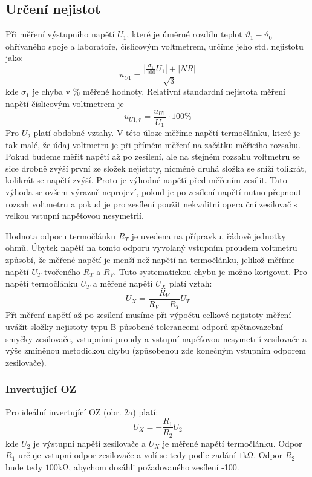 \documentclass{article}
\begin{document}
\subsection{Určení nejistot}
Při měření výstupního napětí $U_1$, které je úměrné rozdílu teplot $\vartheta_1 - \vartheta_0$ ohřívaného spoje a laboratoře, číslicovým voltmetrem, určíme jeho std. nejistotu jako:
\begin{equation}
    u_{U1}=\frac{	| \frac{\sigma_1}{100}U_1 | + | NR | }{\sqrt{3}}
\end{equation}
kde $\sigma_1$ je chyba v \% měřené hodnoty. Relativní standardní nejistota měření napětí číslicovým voltmetrem je
\begin{equation}
    u_{U1,r} = \frac{u_{U1}}{U_1} \cdot 100\%
\end{equation}
Pro $U_2$ platí obdobné vztahy. V této úloze měříme napětí termočlánku, které je tak malé, že údaj voltmetru je při přímém měření na začátku měřicího rozsahu. Pokud budeme měřit napětí až po zesílení, ale na stejném rozsahu voltmetru se sice drobně zvýší první ze složek nejistoty, nicméně druhá složka se sníží tolikrát, kolikrát se napětí zvýší. Proto je výhodné napětí před měřením zesílit. Tato výhoda se ovšem výrazně neprojeví, pokud je po zesílení napětí nutno přepnout rozsah voltmetru a pokud je pro zesílení použit nekvalitní opera ční zesilovač s velkou vstupní napěťovou nesymetrií.

Hodnota odporu termočlánku $R_T$ je uvedena na přípravku, řádově jednotky ohmů. Úbytek napětí na tomto odporu vyvolaný vstupním proudem voltmetru způsobí, že měřené napětí je menší než napětí na termočlánku, jelikož měříme napětí $U_T$ tvořeného $R_T$ a $R_V$. Tuto systematickou chybu je možno korigovat. Pro napětí termočlánku $U_T$ a měřené napětí $U_X$ platí vztah:
\begin{equation}
    U_X = \frac{R_V}{R_V+R_T}U_T
\end{equation}
Při měření napětí až po zesílení musíme při výpočtu celkové nejistoty měření uvážit složky nejistoty typu B působené tolerancemi odporů zpětnovazební smyčky zesilovače, vstupními proudy a vstupní napěťovou nesymetrií zesilovače a výše zmíněnou metodickou chybu (způsobenou zde konečným vstupním odporem zesilovače).

\subsubsection{Invertující OZ}
Pro ideální invertující OZ (obr. 2a) platí:
\begin{equation}
    U_X=-\frac{R_1}{R_2}U_2
\end{equation}
kde $U_2$ je výstupní napětí zesilovače a $U_X$ je měřené napětí termočlánku. Odpor $R_1$ určuje vstupní odpor zesilovače a volí se tedy podle zadání $1 \si{\kilo\ohm}$. Odpor $R_2$ bude tedy $100 \si{\kilo\ohm}$, abychom dosáhli požadovaného zesílení -100.
\end{document}
